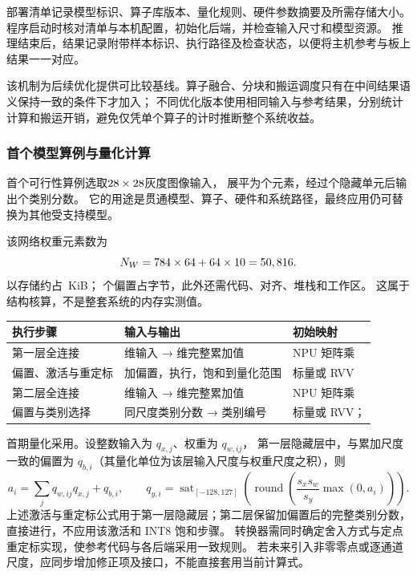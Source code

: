 部署清单记录模型标识、算子库版本、量化规则、硬件参数摘要及所需存储大小。
程序启动时核对清单与本机配置，初始化后端，并检查输入尺寸和模型资源。
推理结束后，结果记录附带样本标识、执行路径及检查状态，以便将主机参考与板上结果一一对应。

该机制为后续优化提供可比较基线。算子融合、分块和搬运调度只有在中间结果语义保持一致的条件下才加入；
不同优化版本使用相同输入与参考结果，分别统计计算和搬运开销，避免仅凭单个算子的计时推断整个系统收益。

\subsubsection{首个模型算例与量化计算}
首个可行性算例选取\(28\times28\)灰度图像输入，
展平为\ModelInputSize{}个元素，经过\ModelHiddenSize{}个隐藏单元后输出\ModelOutputSize{}个类别分数。
它的用途是贯通模型、算子、硬件和系统路径，最终应用仍可替换为其他受支持模型。

该网络权重元素数为
\[
N_W=784\times64+64\times10=50,816.
\]
以\ModelDataType{}存储约占\ModelWeightKiB~KiB；
\ModelBiasCount{}个\ModelAccumulatorType{}偏置占\ModelBiasBytes{}字节，此外还需代码、对齐、堆栈和工作区。
这属于结构核算，不是整套系统的内存实测值。

\par{\small\renewcommand{\arraystretch}{1.2}
\noindent\begin{tabularx}{\linewidth}{@{}P{.18\linewidth}YP{.28\linewidth}@{}}
\toprule
执行步骤 & 输入与输出 & 初始映射\\
\midrule
第一层全连接 & \ModelInputSize{}维输入 → \ModelHiddenSize{}维完整累加值 & NPU 矩阵乘\\
偏置、激活与重定标 & 加偏置，执行\ModelActivation{}，饱和到量化范围 & 标量或 RVV\\
第二层全连接 & \ModelHiddenSize{}维输入 → \ModelOutputSize{}维完整累加值 & NPU 矩阵乘\\
偏置与类别选择 & 同尺度类别分数 → 类别编号 & 标量或 RVV；\ModelOutputOperation{}\\
\bottomrule
\end{tabularx}\par}

首期量化采用\ModelQuantization{}。设整数输入为 \(q_{x,j}\)、权重为 \(q_{w,ij}\)，
第一层隐藏层中，与累加尺度一致的偏置为 \(q_{b,i}\)（其量化单位为该层输入尺度与权重尺度之积），则
\[
a_i=\sum_j q_{w,ij}q_{x,j}+q_{b,i},\qquad
q_{y,i}=\operatorname{sat}_{[-128,127]}
\left(\operatorname{round}\!\left(\frac{s_xs_w}{s_y}\max(0,a_i)\right)\right).
\]
上述激活与重定标公式用于第一层隐藏层；第二层保留加偏置后的完整类别分数，直接进行\ModelOutputOperation{}，不应用该激活和 INT8 饱和步骤。
转换器需同时确定舍入方式与定点重定标实现，使参考代码与各后端采用一致规则。
若未来引入非零零点或逐通道尺度，应同步增加修正项及接口，不能直接套用当前计算式。

